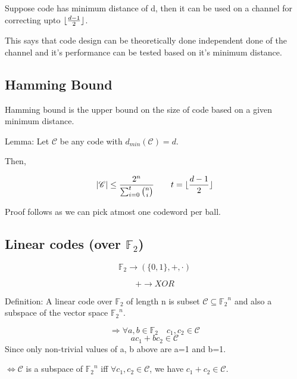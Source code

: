 \documentclass{article}
\DeclarePairedDelimiter{\floor}{\lfloor}{\rfloor}
\begin{document}
Suppose code has minimum distance of d, then it can be used on a channel for correcting upto $\floor{\frac{d-1}{2}}$.

This says that code design can be theoretically done independent done of the channel and it's performance can be tested based on it's minimum distance.

\subsection{Hamming Bound}

Hamming bound is the upper bound on the size of code based on a given minimum distance.

Lemma: Let $\mathscr{C}$ be any code with $d_{min}(\mathscr{C})=d$.

Then,

$$  |\mathscr{C}| \leq \frac{2^n}{\sum_{i=0}^t {n \choose i}} \qquad t= \floor{\frac{d-1}{2}}$$

Proof follows as we can pick atmost one codeword per ball.

\subsection{Linear codes (over $\mathbb{F}_2$)}

$$ \mathbb{F}_2 \to (\{ 0,1\},+,\cdot)$$

$$+ \to XOR$$

Definition: A linear code over $\mathbb{F}_2$ of length n is subset $\mathscr{C} \subseteq {\mathbb{F}_2}^n$ and also a subspace of the vector space ${\mathbb{F}_2}^n$.

$$ \Rightarrow \forall a, b \in \mathbb{F}_2 \quad c_1, c_2 \in \mathscr{C}$$
$$ ac_1 + bc_2 \in \mathscr{C}$$
Since only non-trivial values of a, b above are a=1 and b=1.


$\Leftrightarrow \mathscr{C}$ is a subspace of ${\mathbb{F}_2}^n$ iff $\forall c_1, c_2 \in \mathscr{C}$, we have $c_1 + c_2 \in \mathscr{C}$.
\end{document}
